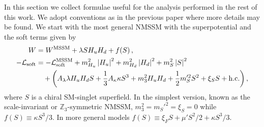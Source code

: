 \documentclass[12pt,twoside]{article}
\def\nn{\nonumber \\}
\begin{document}
In this section we collect formulae useful for the analysis 
performed in the rest of this work. We adopt conventions 
as in the previous paper \cite{BS_NMSSM} 
where more details may be found.
We start with the most general NMSSM with the superpotential 
and the soft terms given by
% 
\begin{align}
\label{W}
W &= W^{\rm MSSM}+\lambda SH_uH_d + f(S) \,,
\\
-{\cal{L}}_{\rm soft}
&= -{\cal{L}}_{\rm soft}^{\rm MSSM}
+m_{H_u}^2\left|H_u\right|^2+m_{H_d}^2\left|H_d\right|^2+m_{S}^2\left|S\right|^2
\nn
&\label{Lsoft}
\quad+\left(
A_\lambda\lambda H_u H_d S +\frac13A_\kappa\kappa S^3
+m_3^2H_uH_d + \frac12 m_S'^2S^2 + \xi_SS
+{\rm h.c.}\right),
\end{align}
%
where $S$ is a chiral SM-singlet superfield. 
In the simplest version, known as the scale-invariant 
or $\mathbb Z_3$-symmetric NMSSM, 
$m_3^2=m_S'^2=\xi_S=0$ while $f(S)\equiv\kappa S^3/3$. In more general 
models $f(S)\equiv\xi_F S+\mu'S^2/2+\kappa S^3/3$.
\end{document}
